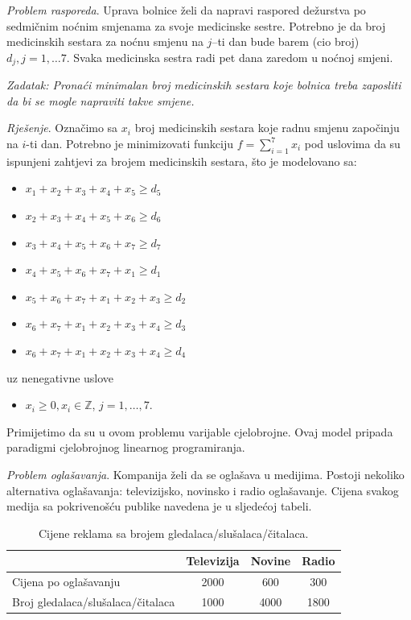 \documentclass[a4paper, utf8, 11pt, colorlinks]{book}
\begin{document}
\emph{Problem rasporeda}. Uprava bolnice želi da napravi raspored dežurstva po sedmičnim noćnim smjenama za svoje medicinske sestre. Potrebno je da broj medicinskih sestara za noćnu smjenu na $j$--ti dan bude barem (cio broj) $d_j, j = 1,\ldots 7$. Svaka
medicinska sestra radi pet dana zaredom u noćnoj smjeni. 

\emph{Zadatak: Pronaći minimalan broj medicinskih sestara koje bolnica treba zaposliti da bi se mogle napraviti takve smjene.}

\emph{Rješenje}. Označimo sa $x_i$ broj medicinskih sestara koje radnu smjenu započinju na $i$-ti dan. Potrebno je minimizovati funkciju 
$f = \sum_{i=1}^7 x_i$ pod uslovima da su ispunjeni zahtjevi za brojem medicinskih sestara, što je modelovano sa:
\begin{itemize}
	\item $x_1 + x_2 + x_3 + x_4 + x_5 \geq d_5 $
	\item $x_2 + x_3 + x_4 + x_5 + x_6 \geq d_6$
	\item $x_3 + x_4 + x_5 + x_6 + x_7 \geq d_7$
	\item $x_4 + x_5 + x_6 + x_7 + x_1 \geq d_1 $
	\item $x_5 + x_6 + x_7 + x_1 + x_2 + x_3 \geq d_2$
	\item $x_6 + x_7 + x_1 + x_2 + x_3 + x_4 \geq d_3$
	\item $x_6 + x_7 + x_1 + x_2 + x_3 + x_4 \geq d_4$
\end{itemize}
uz nenegativne uslove 
\begin{itemize}
	\item $x_i \geq 0, x_i \in \mathbb{Z}$, $j=1,\ldots,7.$
\end{itemize}
Primijetimo da su u ovom problemu varijable  cjelobrojne. Ovaj model pripada paradigmi cjelobrojnog linearnog programiranja.

\emph{Problem oglašavanja}. Kompanija želi da se oglašava u medijima. Postoji nekoliko alternativa oglašavanja:  televizijsko, novinsko i radio oglašavanje. Cijena svakog medija sa pokrivenošću publike navedena je u sljedećoj tabeli.

\begin{table}[!ht]
	\centering
	\begin{tabular}{l|c|c|c} \hline
		\                  & Televizija & Novine & Radio  \\ \hline
		Cijena po oglašavanju      & 2000       & 600    & 300    \\
		Broj gledalaca/slušalaca/čitalaca      & 1000      & 4000  & 1800 \\ \hline
	\end{tabular}
	\caption{Cijene reklama sa brojem gledalaca/slušalaca/čitalaca.}
	\label{tab:tab_model_advertising}
\end{table}
\end{document}
